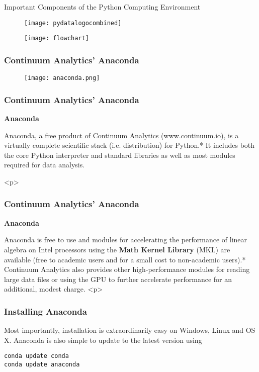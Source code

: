 

\begin{frame}
\huge
Important Components of the Python Computing Environment
\end{frame}
\begin{frame}
	\begin{figure}
		\centering
		\texttt{[image: pydatalogocombined]}
	\end{figure}
	
\end{frame}
\begin{frame}
	\begin{figure}
\centering
\texttt{[image: flowchart]}

\end{figure}

\end{frame}
\begin{frame}
	\frametitle{Continuum Analytics’ Anaconda}
	\begin{figure}
\centering
\texttt{[image: anaconda.png]}

\end{figure}

\end{frame}
\begin{frame}
\frametitle{Continuum Analytics’ Anaconda}
\Large
\textbf{Anaconda}

 Anaconda, a free product of Continuum Analytics (www.continuum.io), is a virtually complete scientific
stack (i.e. distribution) for Python.* It includes both the core Python interpreter and standard libraries as well as most
modules required for data analysis. 

<p>
\end{frame}
\begin{frame}
\frametitle{Continuum Analytics’ Anaconda}
\Large
\textbf{Anaconda}
	
 Anaconda is free to use and modules for accelerating the performance
of linear algebra on Intel processors using the \textbf{Math Kernel Library} (MKL) are available (free to
academic users and for a small cost to non-academic users).* Continuum Analytics also provides other
high-performance modules for reading large data files or using the GPU to further accelerate performance
for an additional, modest charge. 
	<p>

\end{frame}
\begin{frame}[fragile]
\frametitle{Installing Anaconda}
\Large
Most importantly, installation is extraordinarily easy on Windows, Linux
and OS X. Anaconda is also simple to update to the latest version using
\begin{framed}
\begin{verbatim}
conda update conda
conda update anaconda
\end{verbatim}
\end{framed}
\end{frame}


